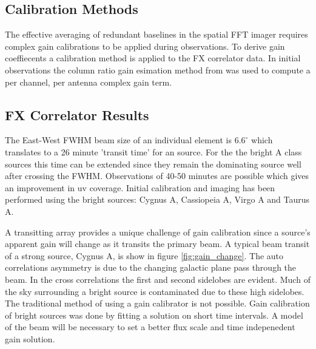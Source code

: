 \documentclass[useAMS,usenatbib,onecolumn]{mn2e}
\begin{document}
\subsection{Calibration Methods}

The effective averaging of redundant baselines in the spatial FFT imager requires complex gain calibrations to be applied during observations.
To derive gain coeffiecents a calibration method is applied to the FX correlator data.
In initial observations the column ratio gain esimation method from \citep{gaindecomp} was used to compute a per channel, per antenna complex gain term.

\subsection{FX Correlator Results}

The East-West FWHM beam size of an individual element is $6.6^{\circ}$ which translates to a 26 minute 'transit time' for an source.
For the the bright A class sources this time can be extended since they remain the dominating source well after crossing the FWHM.
Observations of 40-50 minutes are possible which gives an improvement in uv coverage.
Initial calibration and imaging has been performed using the bright sources: Cygnus A, Cassiopeia A, Virgo A and Taurus A.

A transitting array provides a unique challenge of gain calibration since a source's apparent gain will change as it transits the primary beam.
A typical beam transit of a strong source, Cygnus A, is show in figure \ref{fig:gain_change}.
The auto correlations asymmetry is due to the changing galactic plane pass through the beam.
In the cross correlations the first and second sidelobes are evident.
Much of the sky surrounding a bright source is contaminated due to these high sidelobes.
The traditional method of using a gain calibrator is not possible.
Gain calibration of bright sources was done by fitting a solution on short time intervals.
A model of the beam will be necessary to set a better flux scale and time indepenedent gain solution.
\end{document}
